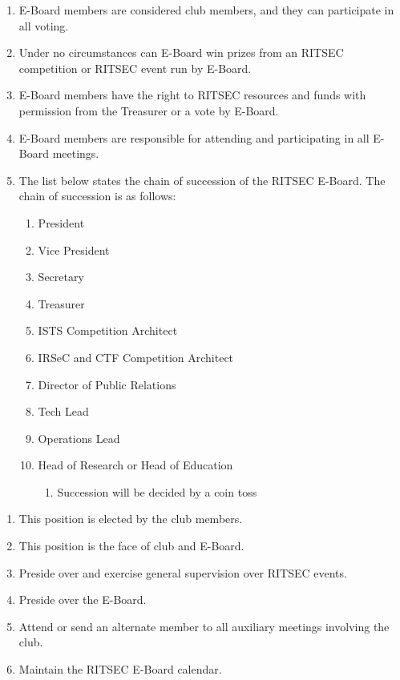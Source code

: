 


\begin{enumerate}
	\item E-Board members are considered club members, and they can participate in all
	      voting.
	\item Under no circumstances can E-Board win prizes from an RITSEC competition or
	      RITSEC event run by E-Board.
	\item E-Board members have the right to RITSEC resources and funds with permission
	      from the Treasurer or a vote by E-Board.
	\item E-Board members are responsible for attending and participating in all E-Board
	      meetings.
	\item The list below states the chain of succession of the RITSEC E-Board. The chain
	      of succession is as follows:
	      \begin{enumerate}
		      \item President
		      \item Vice President
		      \item Secretary
		      \item Treasurer
		      \item ISTS Competition Architect
		      \item IRSeC and CTF Competition Architect
		      \item Director of Public Relations
		      \item Tech Lead
		      \item Operations Lead
		      \item Head of Research or Head of Education
		            \begin{enumerate}
			            \item Succession will be decided by a coin toss
		            \end{enumerate}
	      \end{enumerate}
\end{enumerate}


\begin{enumerate}
	\item This position is elected by the club members.
	\item This position is the face of club and E-Board.
	\item Preside over and exercise general supervision over RITSEC events.
	\item Preside over the E-Board.
	\item Attend or send an alternate member to all auxiliary meetings involving the
	      club.
	\item Maintain the RITSEC E-Board calendar.
\end{enumerate}

